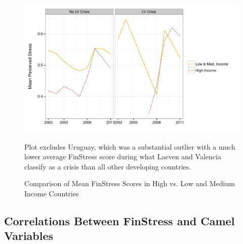 \documentclass[]{article}
\begin{document}
\begin{figure}
    \caption{Comparison of Mean FinStress Scores in High vs. Low and Medium Income Countries}
    \label{comp_dev_developing}

    \begin{center}
        \includegraphics[scale=0.55]{figures/dev_vs_developing.pdf}
    \end{center}
    {\scriptsize{Plot excludes Uruguay, which was a substantial outlier with a much lower average FinStress score during what Laeven and Valencia classify as a crisis than all other developing countries.}}
\end{figure}

\subsection*{Correlations Between FinStress and Camel Variables}
\end{document}
